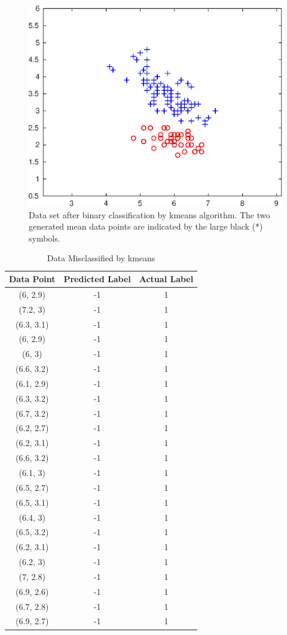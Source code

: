 \documentclass{article}
\begin{document}
	\begin{figure}[H]
		\centering
		\includegraphics{plot2}
		\caption{Data set after binary classification by kmeans algorithm. The two generated mean data points are indicated by the large black (*) symbols.}
	\end{figure}
	\begin{table}[H]
		\caption{Data Misclassified by kmeans}
		\centering
		\begin{tabular}{ c | c | c }
			\hline
			\hline	
			Data Point & Predicted Label & Actual Label\\
			\hline
			(6, 2.9) & -1 & 1\\
			(7.2, 3) & -1 & 1\\
			(6.3, 3.1) & -1 & 1\\
			(6, 2.9) & -1 & 1\\
			(6, 3) & -1 & 1\\
			(6.6, 3.2) & -1 & 1\\
			(6.1, 2.9) & -1 & 1\\
			(6.3, 3.2) & -1 & 1\\
			(6.7, 3.2) & -1 & 1\\
			(6.2, 2.7) & -1 & 1\\
			(6.2, 3.1) & -1 & 1\\
			(6.6, 3.2) & -1 & 1\\
			(6.1, 3) & -1 & 1\\
			(6.5, 2.7) & -1 & 1\\
			(6.5, 3.1) & -1 & 1\\
			(6.4, 3) & -1 & 1\\
			(6.5, 3.2) & -1 & 1\\
			(6.2, 3.1) & -1 & 1\\
			(6.2, 3) & -1 & 1\\
			(7, 2.8) & -1 & 1\\
			(6.9, 2.6) & -1 & 1\\
			(6.7, 2.8) & -1 & 1\\
			(6.9, 2.7) & -1 & 1\\
			\hline
		\end{tabular}
	\end{table}
\end{document}
